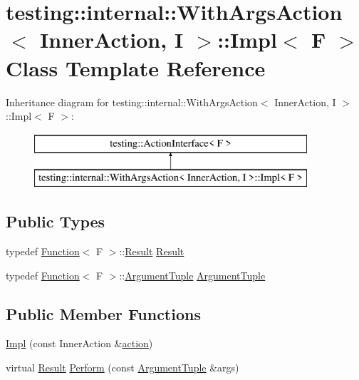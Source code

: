 \hypertarget{classtesting_1_1internal_1_1_with_args_action_1_1_impl}{}\section{testing\+::internal\+::With\+Args\+Action$<$ Inner\+Action, I $>$\+::Impl$<$ F $>$ Class Template Reference}
\label{classtesting_1_1internal_1_1_with_args_action_1_1_impl}
Inheritance diagram for testing\+::internal\+::With\+Args\+Action$<$ Inner\+Action, I $>$\+::Impl$<$ F $>$\+:\begin{figure}[H]
\begin{center}
\leavevmode
\includegraphics[height=2.000000cm]{d8/ddc/classtesting_1_1internal_1_1_with_args_action_1_1_impl}
\end{center}
\end{figure}
\subsection*{Public Types}
\begin{DoxyCompactItemize}
\item 
typedef \mbox{\hyperlink{structtesting_1_1internal_1_1_function}{Function}}$<$ F $>$\+::\mbox{\hyperlink{classtesting_1_1_action_interface_a7477de2fe3e4e01c59db698203acaee7}{Result}} \mbox{\hyperlink{classtesting_1_1internal_1_1_with_args_action_1_1_impl_ab8a9af39768c3d6e1b879a3b96f228a4}{Result}}
\item 
typedef \mbox{\hyperlink{structtesting_1_1internal_1_1_function}{Function}}$<$ F $>$\+::\mbox{\hyperlink{classtesting_1_1_action_interface_af72720d864da4d606629e83edc003511}{Argument\+Tuple}} \mbox{\hyperlink{classtesting_1_1internal_1_1_with_args_action_1_1_impl_adf88b511330a7bbc0f8cb2e916893b5c}{Argument\+Tuple}}
\end{DoxyCompactItemize}
\subsection*{Public Member Functions}
\begin{DoxyCompactItemize}
\item 
\mbox{\hyperlink{classtesting_1_1internal_1_1_with_args_action_1_1_impl_a42e86700ade7d625fee2dbdcf51ac7c1}{Impl}} (const Inner\+Action \&\mbox{\hyperlink{structtesting_1_1internal_1_1_with_args_action_af1676990dc34762bb0eab2ff6047cf52}{action}})
\item 
virtual \mbox{\hyperlink{classtesting_1_1_action_interface_a7477de2fe3e4e01c59db698203acaee7}{Result}} \mbox{\hyperlink{classtesting_1_1internal_1_1_with_args_action_1_1_impl_a4b01eaaab6fc8dab3cec31991cf79766}{Perform}} (const \mbox{\hyperlink{classtesting_1_1_action_interface_af72720d864da4d606629e83edc003511}{Argument\+Tuple}} \&args)
\end{DoxyCompactItemize}
